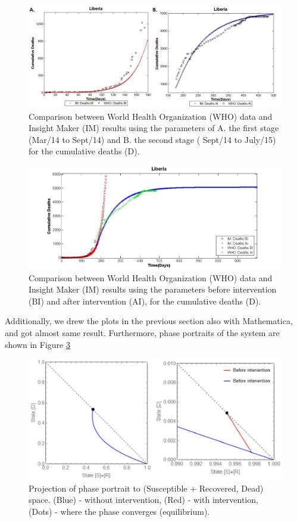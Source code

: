 \begin{figure}[!h]
  \centering
  \includegraphics[width=1\textwidth]{LB_BI_AI_SD_WHO_IM}
  \caption{ Comparison between World Health Organization (WHO) data and Insight Maker (IM) results using the parameters of A. the first stage (Mar/14 to Sept/14) and B. the second stage ( Sept/14 to July/15) for the cumulative deaths (D).}
\label{fig:LB_IM_WHO} 
\end{figure}



\begin{figure}[!h]
  \centering
  \includegraphics[width=1\textwidth]{LB_Int2_SD_WHO_IM}
  \caption{ Comparison between World Health Organization (WHO) data and Insight Maker (IM) results using the parameters before intervention (BI) and after intervention (AI), for the cumulative deaths (D).}
\label{fig:LB_IM_WHO2} 
\end{figure}


Additionally, we drew the plots in the previous section also with Mathematica, and got almost same result. Furthermore, phase portraits of the system are shown in Figure \ref{fig:PhasePortrait}

\begin{figure}[!h]
  \centering
  \includegraphics[width=1\textwidth]{PhasePortrait}
  \caption{Projection of phase portrait to (Susceptible + Recovered, Dead) space. (Blue) - without intervention, (Red) - with intervention, (Dots) - where the phase converges (equilibrium).}
\label{fig:PhasePortrait}
\end{figure}
